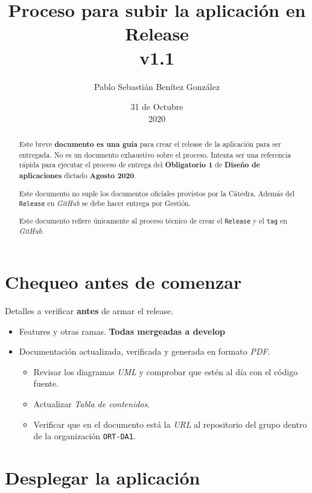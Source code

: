 \documentclass[12pt,a4paper]{article}
\title{Proceso para subir la aplicación en Release\\v1.1}
\author{Pablo Sebastián Benítez González}
\date{31 de Octubre\\2020}
\begin{document}
\maketitle

\tableofcontents

\clearpage

\begin{abstract}
Este breve \textbf{documento es una guía} para crear el release de la aplicación para ser entregada. No es un documento exhaustivo sobre el proceso. Intenta ser una referencia rápida para ejecutar el proceso de entrega del \textbf{Obligatorio 1} de \textbf{Diseño de aplicaciones} dictado \textbf{Agosto 2020}.

Este documento no suple los documentos oficiales provistos por la Cátedra. Además del \texttt{Release} en \textit{GitHub} se debe hacer entrega por Gestión.

Este documento refiere únicamente al proceso técnico de crear el \texttt{Release} y el \texttt{tag} en \textit{GitHub}.
\end{abstract}

\section{Chequeo antes de comenzar}

Detalles a verificar \textbf{antes} de armar el release.

\begin{itemize}
	\item Features y otras ramas. \textbf{Todas mergeadas a develop}
	\item Documentación actualizada, verificada y generada en formato \textit{PDF}.
	\begin{itemize}
		\item Revisar los diagramas \textit{UML} y comprobar que estén al día con el código fuente.
		\item Actualizar \textit{Tabla de contenidos}.
		\item Verificar que en el documento está la \textit{URL} al repositorio del grupo dentro de la organización \texttt{ORT-DA1}.
	\end{itemize}
\end{itemize}

\section{Desplegar la aplicación}
\end{document}
